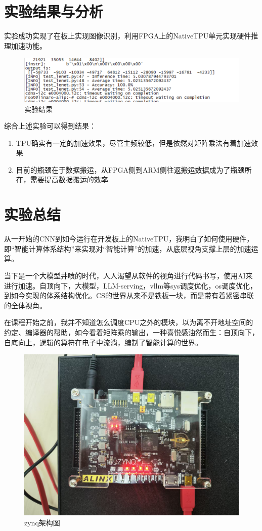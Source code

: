 \documentclass[12pt,a4paper]{article}
\begin{document}
\section{实验结果与分析}

实验成功实现了在板上实现图像识别，利用FPGA上的NativeTPU单元实现硬件推理加速功能。

\begin{figure}[htbp]
  \centering
  \includegraphics[width=1\linewidth]{img/result.png}
  \caption{实验结果}
\end{figure}

综合上述实验可以得到结果：

\begin{enumerate}
\item
  TPU确实有一定的加速效果，尽管主频较低，但是依然对矩阵乘法有着加速效果
\item
  目前的瓶颈在于数据搬运，从FPGA侧到ARM侧往返搬运数据成为了瓶颈所在，需要提高数据搬运的效率
\end{enumerate}

\section{实验总结}

从一开始的CNN到如今运行在开发板上的NativeTPU，我明白了如何使用硬件，即“智能计算体系结构”来实现对“智能计算”的加速，从底层视角支撑上层的加速运算。

当下是一个大模型井喷的时代，人人渴望从软件的视角进行代码书写，使用AI来进行加速。自顶向下，大模型，LLM-serving，vllm等sys调度优化，os调度优化，到如今实现的体系结构优化。CS的世界从来不是铁板一块，而是带有着紧密串联的全体视角。

在课程开始之前，我并不知道怎么调度CPU之外的模块，以为离不开地址空间的约定、编译器的帮助，如今看着矩阵乘的输出，一种喜悦感油然而生：自顶向下，自底向上，逻辑的算符在电子中流淌，编制了智能计算的世界。

\begin{figure}[htbp]
  \centering
  \includegraphics[width=0.6\linewidth]{img/zynq.jpeg}
  \caption{zynq架构图}
\end{figure}
\end{document}

